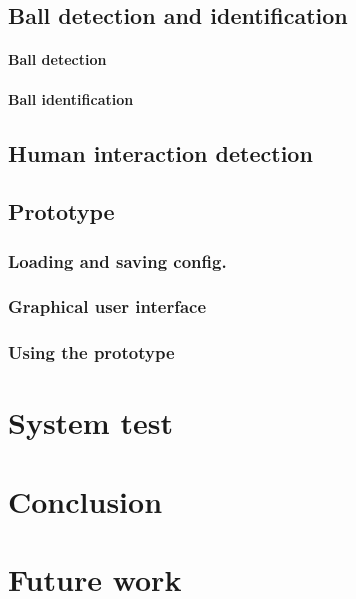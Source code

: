 	\section{Ball detection and identification}
		\label{sec:balls-intro}	
			
		
			\subsubsection{Ball detection}
				\label{sec:balls-locate}
				
		
			\subsubsection{Ball identification}
				\label{sec:balls-id}
				
				
	\section{Human interaction detection}
		\label{sec:shotdetection}
		
				
	\section{Prototype}
		
		
		\subsection{Loading and saving config.}
			\label{sec:loadsaveconfig}
					
		
		\subsection{Graphical user interface}
			\label{sec:gui}	
			
			
		\subsection{Using the prototype}
			\label{sec:using prototype}
			
		
\chapter{System test}
	\label{sec:system-test}
	
	
\chapter{Conclusion}
	\label{sec:conclusion}
	
	
\chapter{Future work}
	\label{sec:futurework}
	



\listoffixmes



